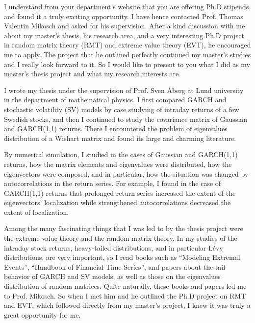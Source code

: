 \documentclass[10pt,stdletter,dateno,sigleft]{newlfm} %
\begin{document}
\begin{newlfm}


I understand from your department's website that you are offering Ph.D
stipends, and found it a truly exciting opportunity. I have hence
contacted Prof. Thomas Valentin Mikosch and asked for his
supervision. After a kind discussion with me about my master's 
thesis, his research area, and a very interesting Ph.D project in
random matrix theory (RMT) and extreme value theory (EVT), he
encouraged me to apply. The project that he outlined perfectly
continued my master's studies and I really look forward to it. So I
would like to present to you what I did as my master's thesis project
and what my research interests are.

I wrote my thesis under the supervision of Prof. Sven \AA berg at Lund
university in the department of mathematical physics. I first compared
GARCH and stochastic volatility (SV) models by case studying of
intraday returns of a few Swedish stocks, and then I continued to
study the covariance matrix of Gaussian and GARCH(1,1) returns. There
I encountered the problem of eigenvalues distribution of a Wishart
matrix and found its large and charming literature.

By numerical simulation, I studied in the cases of Gaussian and
GARCH(1,1) returns, how the matrix elements and eigenvalues were
distributed, how the eigenvectors were composed, and in particular,
how the situation was changed by autocorrelations in the return
series. For example, I found in the case of GARCH(1,1) returns that
prolonged return series increased the extent of the eigenvectors'
localization while strengthened autocorrelations decreased the extent
of localization.

Among the many fascinating things that I was led to by the thesis
project were the extreme value theory and the random matrix
theory. In my studies of the intraday stock returns, heavy-tailed
distributions, and in particular L\'evy distributions, are very
important, so I read books such as ``Modeling Extremal Events'',
``Handbook of Financial Time Series'', and papers about the tail
behavior of GARCH and SV models, as well as those on the eigenvalues
distribution of random matrices. Quite naturally, these books and
papers led me to Prof. Mikosch. So when I met him and he outlined the
Ph.D project on RMT and EVT, which followed directly from my master's
project, I knew it was truly a great opportunity for me.


\end{newlfm}
\end{document}
